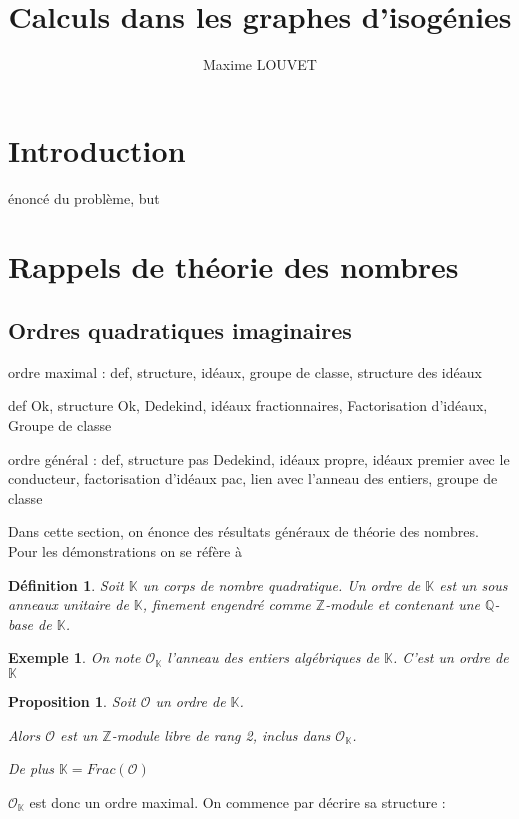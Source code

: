 \documentclass{article}
\title{Calculs dans les graphes d'isogénies}
\author{Maxime LOUVET}
\newcommand{\Z}[0]{\mathbb{Z}}
\newcommand{\Q}[0]{\mathbb{Q}}
\newcommand{\K}[0]{\mathbb{K}}
\newcommand{\OR}[0]{\mathcal{O}}
\newtheorem{Prop}[The]{Proposition}
\newtheorem{Def}[The]{Définition}
\newtheorem{Ex}[The]{Exemple}
\begin{document}
\maketitle
\tableofcontents

\section{Introduction}
énoncé du problème, but

\section{Rappels de théorie des nombres}

\subsection{Ordres quadratiques imaginaires}

ordre maximal : 
def, structure, idéaux, groupe de classe, structure des idéaux

def Ok, structure Ok, Dedekind, idéaux fractionnaires, Factorisation d'idéaux, Groupe de classe 

ordre général :
def, structure pas Dedekind, idéaux propre, idéaux premier avec le conducteur, factorisation d'idéaux pac, lien avec l'anneau des entiers, groupe de classe


Dans cette section, on énonce des résultats généraux de théorie des nombres. Pour les démonstrations on se réfère à 


\begin{Def}
	Soit $\K$ un corps de nombre quadratique. Un ordre de $\K$ est un sous anneaux unitaire de $\K$, finement engendré comme $\Z$-module et contenant une $\Q$-base de $\K$.
\end{Def}

\begin{Ex}
	On note $\OR_{\K}$ l'anneau des entiers algébriques de $\K$. C'est un ordre de $\K$
\end{Ex}

\begin{Prop}
	Soit $\OR$ un ordre de $\K$. 
	
	Alors $\OR$ est un $\Z$-module libre de rang 2, inclus dans $\OR_{\K}$.
	
	De plus $\K = Frac(\OR)$
\end{Prop}

$\OR_{\K}$ est donc un ordre maximal. On commence par décrire sa structure :
\end{document}
